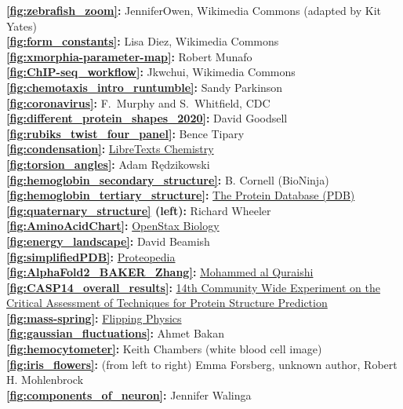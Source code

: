 \textbf{\autoref{fig:zebrafish_zoom}:} JenniferOwen, Wikimedia Commons (adapted by Kit Yates)\\
\textbf{\autoref{fig:form_constants}:} Lisa Diez, Wikimedia Commons\\
\textbf{\autoref{fig:xmorphia-parameter-map}:} Robert Munafo\\
\textbf{\autoref{fig:ChIP-seq_workflow}:} Jkwchui, Wikimedia Commons\\
\textbf{\autoref{fig:chemotaxis_intro_runtumble}:} Sandy Parkinson\\
\textbf{\autoref{fig:coronavirus}:} F.~Murphy and S.~Whitfield, CDC\\
\textbf{\autoref{fig:different_protein_shapes_2020}:} David Goodsell\\
\textbf{\autoref{fig:rubiks_twist_four_panel}:} Bence Tipary\\
\textbf{\autoref{fig:condensation}:} \href{https://bit.ly/3q0Ph8V}{LibreTexts Chemistry}\\
\textbf{\autoref{fig:torsion_angles}:} Adam Rędzikowski\\
\textbf{\autoref{fig:hemoglobin_secondary_structure}:} B. Cornell (BioNinja)\\
\textbf{\autoref{fig:hemoglobin_tertiary_structure}:} \href{https://www.rcsb.org/structure/1SI4}{The Protein Database (PDB)}\\
\textbf{\autoref{fig:quaternary_structure} (left):} Richard Wheeler\\
\textbf{\autoref{fig:AminoAcidChart}:} \href{https://openstax.org/books/biology/pages/1-introduction}{OpenStax Biology}\\
\textbf{\autoref{fig:energy_landscape}:} David Beamish\\
\textbf{\autoref{fig:simplifiedPDB}:} \href{https://proteopedia.org/wiki/index.php/Atomic_coordinate_file}{Proteopedia}\\
\textbf{\autoref{fig:AlphaFold2_BAKER_Zhang}:} \href{https://bit.ly/39Mnym3}{Mohammed al Quraishi}\\
\textbf{\autoref{fig:CASP14_overall_results}:} \href{https://predictioncenter.org/casp14/zscores_final.cgi}{14th Community Wide Experiment on the Critical Assessment of Techniques for Protein Structure Prediction}\\
\textbf{\autoref{fig:mass-spring}:} \href{flippingphysics.com}{Flipping Physics}\\
\textbf{\autoref{fig:gaussian_fluctuations}:} Ahmet Bakan\\
\textbf{\autoref{fig:hemocytometer}:} Keith Chambers (white blood cell image)\\
\textbf{\autoref{fig:iris_flowers}:} (from left to right) Emma Forsberg, unknown author, Robert H. Mohlenbrock\\
\textbf{\autoref{fig:components_of_neuron}:} Jennifer Walinga\\



\clearpage
\thispagestyle{empty}
\phantom{}
